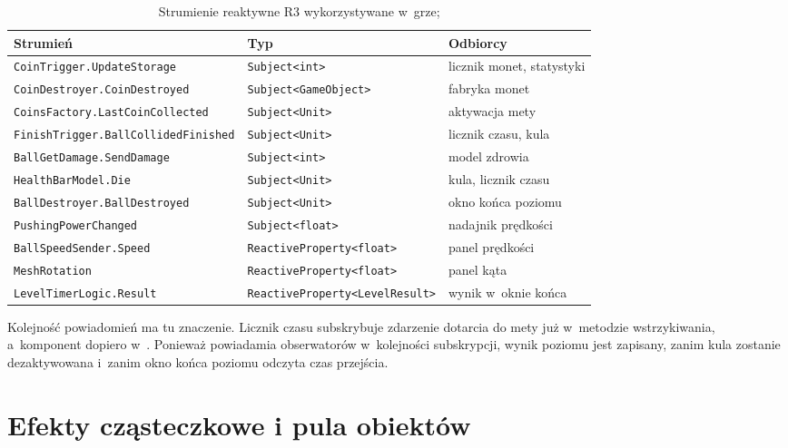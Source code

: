 \begin{table}[!htb]
  \centering
  \caption{Strumienie reaktywne R3 wykorzystywane w~grze; \zrodloWlasne}
  \label{tab:strumienie}
  \footnotesize
  \begin{tabularx}{\textwidth}{>{\raggedright\arraybackslash}p{6.15cm} >{\raggedright\arraybackslash}p{5.25cm} X}
    \toprule
    \textbf{Strumień} & \textbf{Typ} & \textbf{Odbiorcy} \\
    \midrule
    \texttt{CoinTrigger.UpdateStorage} & \texttt{Subject<int>} & licznik monet, statystyki \\
    \texttt{CoinDestroyer.CoinDestroyed} & \texttt{Subject<GameObject>} & fabryka monet \\
    \texttt{CoinsFactory.LastCoinCollected} & \texttt{Subject<Unit>} & aktywacja mety \\
    \texttt{FinishTrigger.BallCollidedFinished} & \texttt{Subject<Unit>} & licznik czasu, kula \\
    \texttt{BallGetDamage.SendDamage} & \texttt{Subject<int>} & model zdrowia \\
    \texttt{HealthBarModel.Die} & \texttt{Subject<Unit>} & kula, licznik czasu \\
    \texttt{BallDestroyer.BallDestroyed} & \texttt{Subject<Unit>} & okno końca poziomu \\
    \texttt{PushingPowerChanged} & \texttt{Subject<float>} & nadajnik prędkości \\
    \texttt{BallSpeedSender.Speed} & \texttt{ReactiveProperty<float>} & panel prędkości \\
    \texttt{MeshRotation} & \texttt{ReactiveProperty<float>} & panel kąta \\
    \texttt{LevelTimerLogic.Result} & \texttt{ReactiveProperty<LevelResult>} & wynik w~oknie końca \\
    \bottomrule
  \end{tabularx}
\end{table}

Kolejność powiadomień ma tu znaczenie. Licznik czasu subskrybuje zdarzenie dotarcia do
mety już w~metodzie wstrzykiwania, a~komponent  dopiero
w~. Ponieważ  powiadamia obserwatorów w~kolejności subskrypcji,
wynik poziomu jest zapisany, zanim kula zostanie dezaktywowana i~zanim okno końca poziomu
odczyta czas przejścia.

\section{Efekty cząsteczkowe i pula obiektów}

